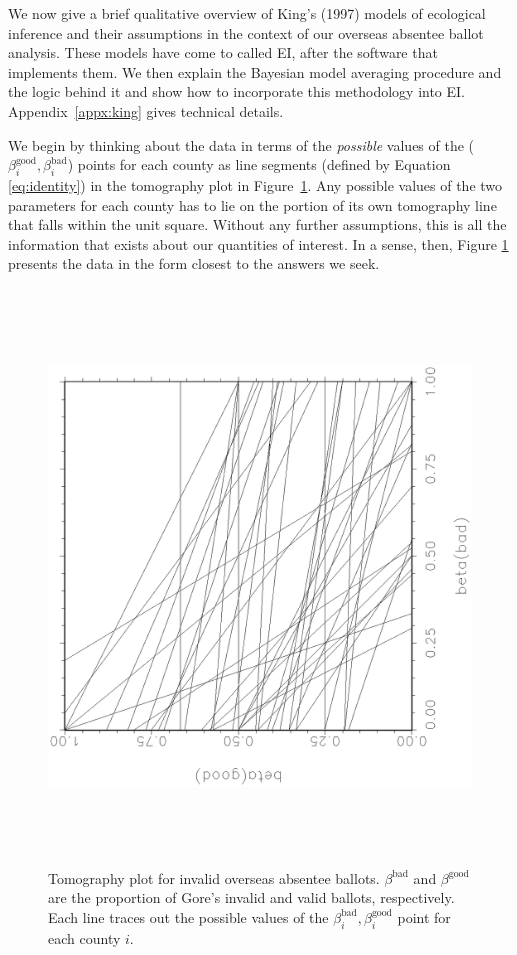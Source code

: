 \documentclass[11pt,titlepage]{article}
\newcommand{\bb}{\beta^{\text{bad}}}
\newcommand{\bg}{\beta^{\text{good}}}
\begin{document}
We now give a brief qualitative overview of King's (1997) models of
ecological inference \nocite{king:97} and their assumptions in the
context of our overseas absentee ballot analysis.  These models have
come to called EI, after the software that implements them.  We then
explain the Bayesian model averaging procedure and the logic behind it
and show how to incorporate this methodology into EI.
Appendix~\ref{appx:king} gives technical details.

We begin by thinking about the data in terms of the \emph{possible}
values of the ($\bg_i,\bb_i$) points for each county as line segments
(defined by Equation \ref{eq:identity}) in the tomography plot in
Figure~\ref{fg:tomog}.  Any possible values of the two parameters for
each county has to lie on the portion of its own tomography line that
falls within the unit square.  Without any further assumptions, this
is all the information that exists about our quantities of interest.
In a sense, then, Figure \ref{fg:tomog} presents the data in the form
closest to the answers we seek.
\begin{figure}[t]
  \vspace{-1in}\hspace{0.5in}
  \begin{minipage}[c]{6.5in}
    \begin{center}
      \includegraphics[width=4.5in,height=6in,angle=-90]{tomog}
    \end{center}
  \end{minipage}
  \caption{\label{fg:tomog}
    Tomography plot for invalid overseas absentee ballots.  $\bb$ and
    $\bg$ are the proportion of Gore's invalid and valid ballots,
    respectively.  Each line traces out the possible values of the
    $\bb_i,\bg_i$ point for each county $i$.}
\end{figure}
\end{document}
